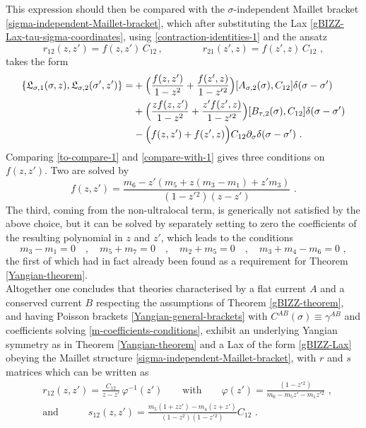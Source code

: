 \documentclass[12pt]{article}
\numberwithin{equation}{section}
\begin{document}
This expression should then be compared with the $\sigma$-independent Maillet bracket \eqref{sigma-independent-Maillet-bracket}, which after substituting the Lax \eqref{gBIZZ-Lax-tau-sigma-coordinates}, using \eqref{contraction-identities-1} and the ansatz
\begin{equation}
r_{12}(z,z')=f(z,z') \,C_{12} \, ,
\qquad \qquad
r_{21}(z',z)=f(z',z) \,C_{12} \,\, ,
\end{equation}
takes the form
\begin{equation}\label{compare-with-1}
\begin{aligned}
\{\mathfrak{L}_{\sigma,1}(\sigma,z),\mathfrak{L}_{\sigma,2}(\sigma',z')\}=&+\Bigl( \frac{f(z,z')}{1-z^2} + \frac{f(z',z)}{1-z'{}^2}\Bigr)[A_{\sigma,2}(\sigma),C_{12}]\delta(\sigma-\sigma')
\\
&+\Bigl( \frac{zf(z,z')}{1-z^2} + \frac{z'f(z',z)}{1-z'{}^2}\Bigr)[B_{\tau,2}(\sigma),C_{12}]\delta(\sigma-\sigma')
\\
&-\Bigl(f(z,z')+f(z',z) \Bigr)C_{12}\partial_{\sigma}\delta(\sigma-\sigma') \,\, .
\end{aligned}
\end{equation}
Comparing \eqref{to-compare-1} and \eqref{compare-with-1} gives three conditions on $f(z,z')$. Two are solved by
\begin{equation}
f(z,z')=\frac{m_{6}-z'(m_{5}+z(m_{3}-m_{1})+z'm_{3})}{(1-z'{}^{2})(z-z')} \,\, .
\end{equation}
The third, coming from the non-ultralocal term, is generically not satisfied by the above choice, but it can be solved by separately setting to zero the coefficients of the resulting polynomial in $z$ and $z'$, which leads to the conditions
\begin{equation}\label{m-coefficients-conditions}
m_{3}-m_{1}=0
\quad , \quad 
m_{5}+m_{7}=0
\quad , \quad 
m_{2}+m_{5}=0
\quad, \quad 
m_{3}+m_{4}-m_{6}=0 \,\, ,
\end{equation}
the first of which had in fact already been found as a requirement for Theorem \ref{Yangian-theorem}. 
\\
\indent
Altogether one concludes that theories characterised by a flat current $A$ and a conserved current $B$ respecting the assumptions of Theorem \ref{gBIZZ-theorem}, and having Poisson brackets \eqref{Yangian-general-brackets} with $C^{AB}(\sigma)\equiv \gamma^{AB}$ and coefficients solving \eqref{m-coefficients-conditions}, exhibit an underlying Yangian symmetry as in Theorem \ref{Yangian-theorem} and a Lax of the form \eqref{gBIZZ-Lax} obeying the Maillet structure \eqref{sigma-independent-Maillet-bracket},
with $r$ and $s$ matrices which can be written as
\begin{equation}
\begin{aligned}
&r_{12}(z,z')=\frac{C_{12}}{z-z'} \, \varphi^{-1}(z') 
\qquad \text{with} \qquad 
\varphi(z')=\frac{(1-z'{}^2)}{m_{6}-m_{5}z'-m_{1}z'{}^2} \,\, ,
\\
&\text{and} \quad \qquad
s_{12}(z,z')=\frac{m_{5}(1+zz')-m_{4}(z+z')}{(1-z^2)(1-z'{}^{2})} C_{12}\,\, .
\end{aligned}
\end{equation}
\end{document}
